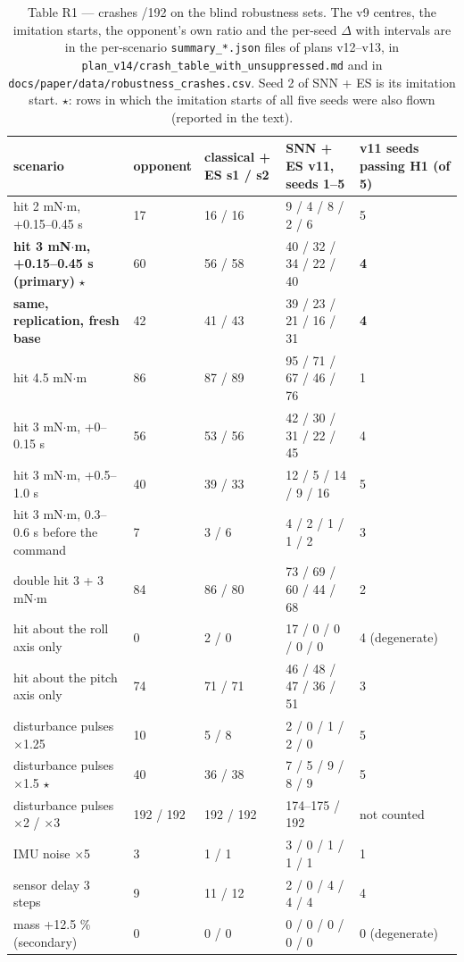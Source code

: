 \documentclass[10pt,a4paper]{article}
\begin{document}
\begin{table}[htbp]\centering\scriptsize
\caption{Table R1 --- crashes /192 on the blind robustness sets. The v9 centres, the imitation starts, the opponent's own ratio and the per-seed $\Delta$ with intervals are in the per-scenario \texttt{summary\_*.json} files of plans v12--v13, in \texttt{plan\_v14/crash\_table\_with\_unsuppressed.md} and in \texttt{docs/paper/data/robustness\_crashes.csv}. Seed 2 of SNN + ES is its imitation start. $\star$: rows in which the imitation starts of all five seeds were also flown (reported in the text).}
\begin{tabularx}{\textwidth}{XlXXX}\toprule
scenario & opponent & classical + ES s1 / s2 & SNN + ES v11, seeds 1--5 & v11 seeds passing H1 (of 5) \\ \midrule
hit 2 mN$\cdot$m, +0.15--0.45 s & 17 & 16 / 16 & 9 / 4 / 8 / 2 / 6 & 5 \\
\textbf{hit 3 mN$\cdot$m, +0.15--0.45 s (primary)} $\star$ & 60 & 56 / 58 & 40 / 32 / 34 / 22 / 40 & \textbf{4} \\
\textbf{same, replication, fresh base} & 42 & 41 / 43 & 39 / 23 / 21 / 16 / 31 & \textbf{4} \\
hit 4.5 mN$\cdot$m & 86 & 87 / 89 & 95 / 71 / 67 / 46 / 76 & 1 \\
hit 3 mN$\cdot$m, +0--0.15 s & 56 & 53 / 56 & 42 / 30 / 31 / 22 / 45 & 4 \\
hit 3 mN$\cdot$m, +0.5--1.0 s & 40 & 39 / 33 & 12 / 5 / 14 / 9 / 16 & 5 \\
hit 3 mN$\cdot$m, 0.3--0.6 s before the command & 7 & 3 / 6 & 4 / 2 / 1 / 1 / 2 & 3 \\
double hit 3 + 3 mN$\cdot$m & 84 & 86 / 80 & 73 / 69 / 60 / 44 / 68 & 2 \\
hit about the roll axis only & 0 & 2 / 0 & 17 / 0 / 0 / 0 / 0 & 4 (degenerate) \\
hit about the pitch axis only & 74 & 71 / 71 & 46 / 48 / 47 / 36 / 51 & 3 \\
disturbance pulses $\times$1.25 & 10 & 5 / 8 & 2 / 0 / 1 / 2 / 0 & 5 \\
disturbance pulses $\times$1.5 $\star$ & 40 & 36 / 38 & 7 / 5 / 9 / 8 / 9 & 5 \\
disturbance pulses $\times$2 / $\times$3 & 192 / 192 & 192 / 192 & 174--175 / 192 & not counted \\
IMU noise $\times$5 & 3 & 1 / 1 & 3 / 0 / 1 / 1 / 1 & 1 \\
sensor delay 3 steps & 9 & 11 / 12 & 2 / 0 / 4 / 4 / 4 & 4 \\
mass +12.5 \% (secondary) & 0 & 0 / 0 & 0 / 0 / 0 / 0 / 0 & 0 (degenerate) \\
\bottomrule\end{tabularx}\end{table}
\end{document}
